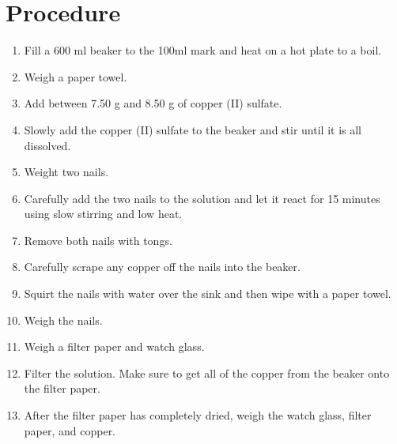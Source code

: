 \documentclass[12pt]{article}
\begin{document}
    \section*{Procedure}
        \begin{enumerate}
            \item Fill a 600 ml beaker to the 100ml mark and heat on a hot plate to a boil.
            \item Weigh a paper towel.
            \item Add between 7.50 g and 8.50 g of copper (II) sulfate.
            \item Slowly add the copper (II) sulfate to the beaker and stir until it is all dissolved.
            \item Weight two nails.
            \item Carefully add the two nails to the solution and let it react for 15 minutes using slow stirring and low heat.
            \item Remove both nails with tongs.
            \item Carefully scrape any copper off the nails into the beaker.
            \item Squirt the nails with water over the sink and then wipe with a paper towel.
            \item Weigh the nails.
            \item Weigh a filter paper and watch glass.
            \item Filter the solution. Make sure to get all of the copper from the beaker onto the filter paper.
            \item After the filter paper has completely dried, weigh the watch glass, filter paper, and copper.
        \end{enumerate}
\end{document}
